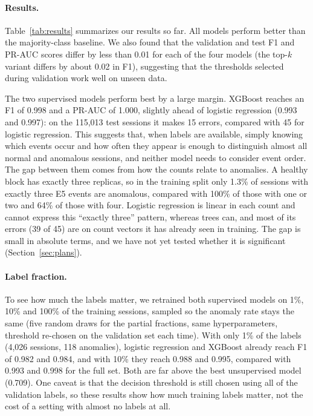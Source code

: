 \documentclass[11pt]{article}
\begin{document}
\paragraph{Results.} Table~\ref{tab:results} summarizes our results so far. All models perform better than the majority-class baseline. We also found that the validation and test F1 and PR-AUC scores differ by less than 0.01 for each of the four models (the top-$k$ variant differs by about 0.02 in F1), suggesting that the thresholds selected during validation work well on unseen data.

The two supervised models perform best by a large margin. XGBoost reaches an F1 of 0.998 and a PR-AUC of 1.000, slightly ahead of logistic regression (0.993 and 0.997): on the 115,013 test sessions it makes 15 errors, compared with 45 for logistic regression. This suggests that, when labels are available, simply knowing which events occur and how often they appear is enough to distinguish almost all normal and anomalous sessions, and neither model needs to consider event order. The gap between them comes from how the counts relate to anomalies. A healthy block has exactly three replicas, so in the training split only 1.3\% of sessions with exactly three E5 events are anomalous, compared with 100\% of those with one or two and 64\% of those with four. Logistic regression is linear in each count and cannot express this ``exactly three'' pattern, whereas trees can, and most of its errors (39 of 45) are on count vectors it has already seen in training. The gap is small in absolute terms, and we have not yet tested whether it is significant (Section~\ref{sec:plans}).

\paragraph{Label fraction.} To see how much the labels matter, we retrained both supervised models on 1\%, 10\% and 100\% of the training sessions, sampled so the anomaly rate stays the same (five random draws for the partial fractions, same hyperparameters, threshold re-chosen on the validation set each time). With only 1\% of the labels (4,026 sessions, 118 anomalies), logistic regression and XGBoost already reach F1 of 0.982 and 0.984, and with 10\% they reach 0.988 and 0.995, compared with 0.993 and 0.998 for the full set. Both are far above the best unsupervised model (0.709). One caveat is that the decision threshold is still chosen using all of the validation labels, so these results show how much training labels matter, not the cost of a setting with almost no labels at all.
\end{document}
